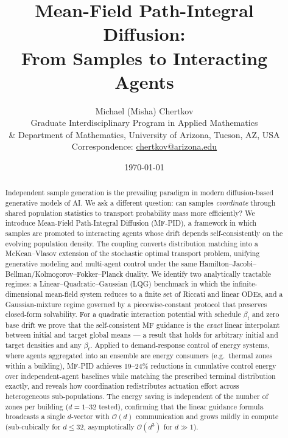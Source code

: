 \documentclass[11pt,onecolumn]{article}
\title{%
  \textbf{Mean-Field Path-Integral Diffusion:\\
  From Samples to Interacting Agents}
}
\author{%
  Michael (Misha) Chertkov\\[2pt]
  \small Graduate Interdisciplinary Program in Applied Mathematics\\
  \small \& Department of Mathematics, University of Arizona, Tucson, AZ, USA\\[2pt]
  \small Correspondence: \href{mailto:chertkov@arizona.edu}{chertkov@arizona.edu}
}
\date{\today}
\begin{document}
\maketitle

\begin{abstract}
Independent sample generation is the prevailing paradigm in modern diffusion-based generative models of AI. We ask a different question: can samples \emph{coordinate} through shared population statistics to transport probability mass more efficiently? We introduce Mean-Field Path-Integral Diffusion (MF-PID), a framework in which samples are promoted to interacting agents whose drift depends self-consistently on the evolving population density. The coupling converts distribution matching into a McKean--Vlasov extension of the stochastic optimal transport problem, unifying generative modeling and multi-agent control under the same Hamilton--Jacobi--Bellman/Kolmogorov--Fokker--Planck duality. We identify two analytically tractable regimes: a Linear--Quadratic--Gaussian (LQG) benchmark in which the infinite-dimensional mean-field system reduces to a finite set of Riccati and linear ODEs, and a Gaussian-mixture regime governed by a piecewise-constant protocol that preserves closed-form solvability. For a quadratic interaction potential with schedule $\beta_t$ and zero base drift we prove that the self-consistent MF guidance is the \emph{exact} linear interpolant between initial and target global means --- a result that holds for arbitrary initial and target densities and any $\beta_t$. Applied to demand-response control of energy systems, where agents aggregated into an ensemble are energy consumers (e.g.\ thermal zones within a building), MF-PID achieves 19--24\% reductions in cumulative control energy over independent-agent baselines while matching the prescribed terminal distribution exactly, and reveals how coordination redistributes actuation effort across heterogeneous sub-populations. The energy saving is independent of the number of zones per building ($d=1$--$32$ tested), confirming that the linear guidance formula broadcasts a single $d$-vector with $\mathcal{O}(d)$ communication and grows mildly in compute (sub-cubically for $d\leq 32$, asymptotically $\mathcal{O}(d^3)$ for $d\gg 1$).
\end{abstract}

%
\end{document}
